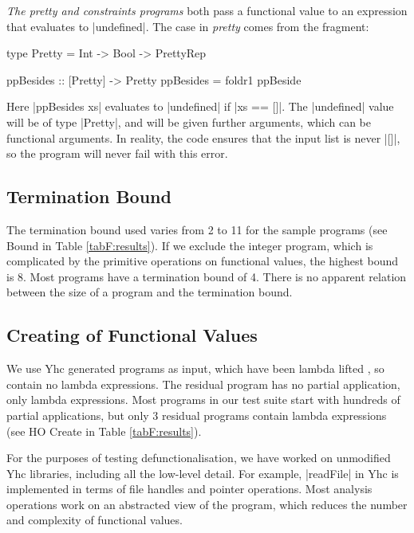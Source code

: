 \begin{example}
\textit{The pretty and constraints programs} both pass a functional value to an expression that evaluates to |undefined|. The case in \textit{pretty} comes from the fragment:

\begin{comment}
\begin{code}
data PrettyRep = PrettyRep
ppBeside :: Pretty -> Pretty -> Pretty
\end{code}
\end{comment}
\begin{code}
type Pretty = Int -> Bool -> PrettyRep

ppBesides :: [Pretty] -> Pretty
ppBesides = foldr1 ppBeside
\end{code}

Here |ppBesides xs| evaluates to |undefined| if |xs == []|. The |undefined| value will be of type |Pretty|, and will be given further arguments, which can be functional arguments. In reality, the code ensures that the input list is never |[]|, so the program will never fail with this error.
\end{example}

\subsection{Termination Bound}

The termination bound used varies from 2 to 11 for the sample programs (see Bound in Table \ref{tabF:results}). If we exclude the integer program, which is complicated by the primitive operations on functional values, the highest bound is 8. Most programs have a termination bound of 4. There is no apparent relation between the size of a program and the termination bound.

\subsection{Creating of Functional Values}

We use Yhc generated programs as input, which have been lambda lifted \cite{lambda_lift}, so contain no lambda expressions. The residual program has no partial application, only lambda expressions. Most programs in our test suite start with hundreds of partial applications, but only 3 residual programs contain lambda expressions (see HO Create in Table \ref{tabF:results}).

For the purposes of testing defunctionalisation, we have worked on unmodified Yhc libraries, including all the low-level detail. For example, |readFile| in Yhc is implemented in terms of file handles and pointer operations. Most analysis operations work on an abstracted view of the program, which reduces the number and complexity of functional values.

